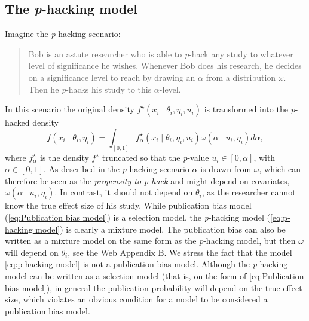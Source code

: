 \documentclass[useAMS,usenatbib,referee]{biom}
\begin{document}
\subsection{The \textit{p}-hacking model}\label{subsect:p-hacking}
Imagine the \textit{p}-hacking scenario:
\begin{quote}
Bob is an astute researcher who is able to \textit{p}-hack any study to whatever level of significance he wishes. Whenever Bob does his research, he decides on a significance level to reach by drawing an $\alpha$ from a distribution $\omega$. Then he \textit{p}-hacks his study to this $\alpha$-level.
\end{quote}
In this scenario the original density $f^{\star}(x_{i}\mid\theta_{i},\eta_{i}, u_i)$
is transformed into the \textit{p}-hacked density
\begin{equation}\label{eq:p-hacking model}
f(x_{i}\mid\theta_{i},\eta_{i})=\int_{[0,1]}f_\alpha^{\star}(x_{i}\mid\theta_{i},\eta_{i}, u_i)\omega(\alpha\mid u_i, \eta_i)d\alpha,
\end{equation}
where $f_\alpha^{\star}$ is the density $f^{\star}$ truncated so that the \textit{p}-value $u_i\in\left[0,\alpha\right]$, with $\alpha \in [0,1]$. As described in the \textit{p}-hacking scenario $\alpha$ is drawn from $\omega$, which can therefore be seen as the \emph{propensity to \textit{p}-hack} and might depend on covariates, $\omega(\alpha \mid u_i, \eta_i)$. In contrast, it should not depend on $\theta_{i}$, as the researcher cannot know the true effect size of his study. While publication bias model (\ref{eq:Publication bias model}) is a selection model, the \textit{p}-hacking model (\ref{eq:p-hacking model}) is clearly a mixture model. The publication bias can also be written as a mixture model on the same form as the \textit{p}-hacking model, but then $\omega$ will depend on $\theta_i$, see the Web Appendix B. We stress the fact that the model \eqref{eq:p-hacking model} is not a publication bias model. Although the \textit{p}-hacking model can be written as a selection model (that is, on the form of \eqref{eq:Publication bias model}), in general the publication probability will depend on the true effect size, which violates an obvious condition for a model to be considered a publication bias model.
\end{document}
